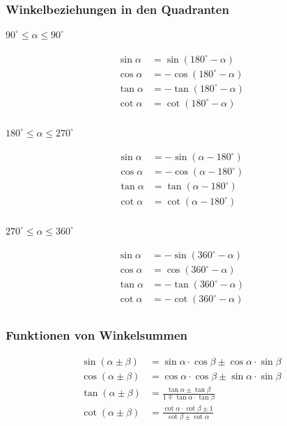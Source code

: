 \subsubsection{Winkelbeziehungen in den Quadranten}
\paragraph{$90^\circ \leq \alpha \leq 90^\circ$}
\begin{align*}
\sin \alpha &= \sin{(180^\circ-\alpha)} \\ 
\cos \alpha &= -\cos{(180^\circ-\alpha)} \\ 
\tan \alpha &= -\tan{(180^\circ-\alpha)} \\ 
\cot \alpha &= \cot{(180^\circ-\alpha)} \\ 
\end{align*}

\paragraph{$180^\circ \leq \alpha \leq 270^\circ$}
\begin{align*}
\sin \alpha &= -\sin{(\alpha-180^\circ)} \\ 
\cos \alpha &= -\cos{(\alpha-180^\circ)} \\ 
\tan \alpha &= \tan{(\alpha-180^\circ)} \\ 
\cot \alpha &= \cot{(\alpha-180^\circ)} \\ 
\end{align*}

\paragraph{$270^\circ \leq \alpha \leq 360^\circ$}
\begin{align*}
\sin \alpha &= -\sin{(360^\circ-\alpha)} \\ 
\cos \alpha &= \cos{(360^\circ-\alpha)} \\ 
\tan \alpha &= -\tan{(360^\circ-\alpha)} \\ 
\cot \alpha &= -\cot{(360^\circ-\alpha)} \\ 
\end{align*}


\subsubsection{Funktionen von Winkelsummen}

\begin{align*}
\sin{(\alpha \pm \beta)} &= \sin{\alpha} \cdot \cos{\beta} \pm \cos{\alpha}  \cdot \sin{\beta} \\
\cos{(\alpha \pm \beta)} &= \cos{\alpha} \cdot \cos{\beta} \pm \sin{\alpha}  \cdot \sin{\beta} \\
\tan{(\alpha \pm \beta)} &= \frac{\tan{\alpha} \pm \tan{\beta}}{1 \mp \tan{\alpha} \cdot \tan{\beta}} \\
\cot{(\alpha \pm \beta)} &= \frac{\cot{\alpha} \cdot \cot{\beta} \pm 1}{\cot{\beta} \pm \cot{\alpha}} \\
\end{align*}

